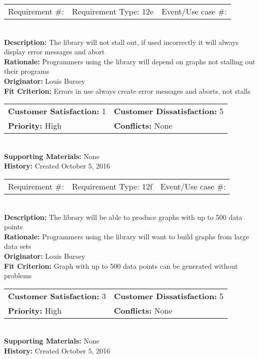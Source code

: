 \documentclass[12pt, titlepage]{article}
\begin{document}
%
%
\begin{reqbox}
\begin{tabular}{ccc}
Requirement \#: & Requirement Type: 12e & Event/Use case \#: \\
\end{tabular} \\
\textbf{Description:} The library will not stall out, if used incorrectly it will always display error messages and abort\\
\textbf{Rationale:} Programmers using the library will depend on graphs not stalling out their programs \\
\textbf{Originator:} Louis Bursey\\
\textbf{Fit Criterion:}    Errors in use always create error messages and aborts, not stalls\\
\begin{tabular}{ll}
\textbf{Customer Satisfaction:} 1 & \textbf{Customer Dissatisfaction:} 5 \\
\textbf{Priority:} High & \textbf{Conflicts:} None\\
\end{tabular} \\
\textbf{Supporting Materials:} None \\
\textbf{History:} Created October 5, 2016
\end{reqbox}
%
%
\begin{reqbox}
\begin{tabular}{ccc}
Requirement \#: & Requirement Type: 12f & Event/Use case \#: \\
\end{tabular} \\
\textbf{Description:} The library will be able to produce graphs with up to 500 data points \\
\textbf{Rationale:} Programmers using the library will want to build graphs from large data sets \\
\textbf{Originator:} Louis Bursey\\
\textbf{Fit Criterion:}  Graph with up to 500 data points can be generated without problems\\
\begin{tabular}{ll}
\textbf{Customer Satisfaction:} 3 & \textbf{Customer Dissatisfaction:} 5 \\
\textbf{Priority:} High & \textbf{Conflicts:} None\\
\end{tabular} \\
\textbf{Supporting Materials:} None \\
\textbf{History:} Created October 5, 2016
\end{reqbox}
%
%
%
\end{document}
